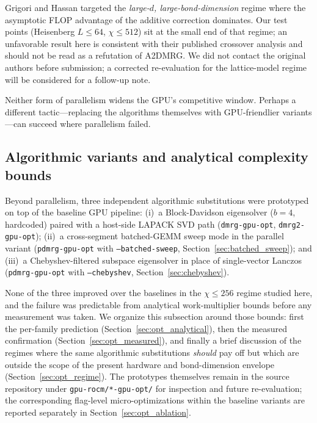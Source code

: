 \documentclass[preprint,12pt]{elsarticle}
\begin{document}
Grigori and Hassan \cite{Grigori2025} targeted the \emph{large-$d$, large-bond-dimension} regime where the asymptotic FLOP advantage of the additive correction dominates.
Our test points (Heisenberg $L \leq 64$, $\chi \leq 512$) sit at the small end of that regime; an unfavorable result here is consistent with their published crossover analysis and should not be read as a refutation of A2DMRG.
We did not contact the original authors before submission; a corrected re-evaluation for the lattice-model regime will be considered for a follow-up note.

Neither form of parallelism widens the GPU's competitive window.  Perhaps a different tactic---replacing the algorithms themselves with GPU-friendlier variants---can succeed where parallelism failed.

\subsection{Algorithmic variants and analytical complexity bounds}
\label{sec:opt_failure}

Beyond parallelism, three independent algorithmic substitutions were prototyped on top of the baseline GPU pipeline:
(i)~a Block-Davidson eigensolver ($b{=}4$, hardcoded) paired with a host-side LAPACK SVD path (\texttt{dmrg-gpu-opt}, \texttt{dmrg2-gpu-opt});
(ii)~a cross-segment batched-GEMM sweep mode in the parallel variant (\texttt{pdmrg-gpu-opt} with \texttt{--batched-sweep}, Section~\ref{sec:batched_sweep});
and (iii)~a Chebyshev-filtered subspace eigensolver in place of single-vector Lanczos (\texttt{pdmrg-gpu-opt} with \texttt{--chebyshev}, Section~\ref{sec:chebyshev}).

None of the three improved over the baselines in the $\chi \le 256$ regime studied here, and the failure was predictable from analytical work-multiplier bounds before any measurement was taken.
We organize this subsection around those bounds: first the per-family prediction (Section~\ref{sec:opt_analytical}), then the measured confirmation (Section~\ref{sec:opt_measured}), and finally a brief discussion of the regimes where the same algorithmic substitutions \emph{should} pay off but which are outside the scope of the present hardware and bond-dimension envelope (Section~\ref{sec:opt_regime}).
The prototypes themselves remain in the source repository under \texttt{gpu-rocm/*-gpu-opt/} for inspection and future re-evaluation; the corresponding flag-level micro-optimizations within the baseline variants are reported separately in Section~\ref{sec:opt_ablation}.
\end{document}
